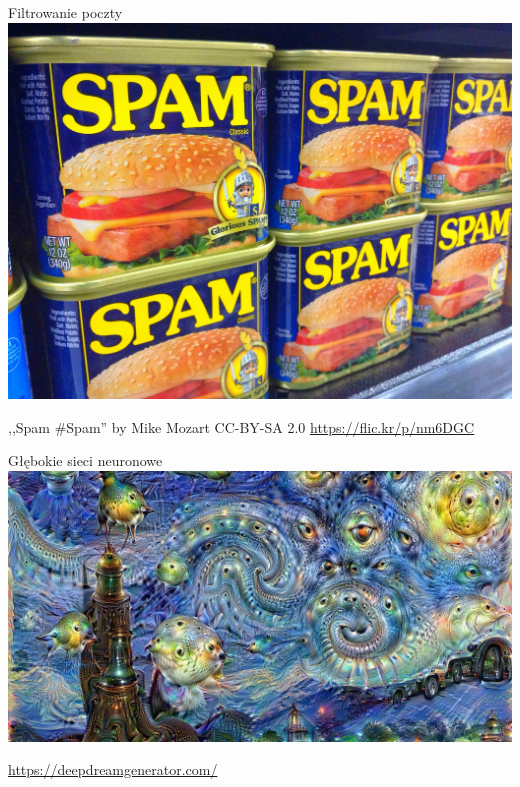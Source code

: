 \documentclass{mp}
\subtitle{Zastosowania probabilistyki w informatyce}
\begin{document}
\begin{frame}
\titlepage
\end{frame}

\begin{frame}{Filtrowanie poczty}
\centering\includegraphics[width=.85\textwidth]{spam.jpg}

{\tiny ,,Spam \#Spam'' by Mike Mozart CC-BY-SA 2.0 \url{https://flic.kr/p/nm6DGC}}
\end{frame}

\begin{frame}{Głębokie sieci neuronowe}
\centering\includegraphics[width=\textwidth]{deepdream.jpg}

\vfill
{\tiny \url{https://deepdreamgenerator.com/}}
\end{frame}
\end{document}
